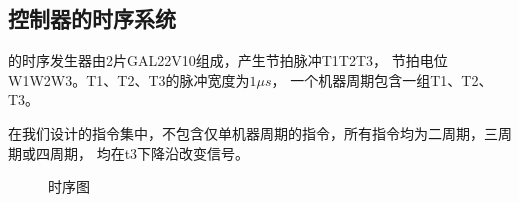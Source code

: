 \subsection{控制器的时序系统}
\tec 的时序发生器由2片GAL22V10组成，产生节拍脉冲T1\comma T2\comma T3，
节拍电位W1\comma W2\comma W3。T1、T2、T3的脉冲宽度为$1\mu s$，
一个机器周期包含一组T1、T2、T3。
\par
在我们设计的指令集中，不包含仅单机器周期的指令，所有指令均为二周期，三周期或四周期，
均在t3下降沿改变信号。
\begin{figure}[htbp]
    \label{clock}
    \caption{\tec 时序图}
\end{figure}